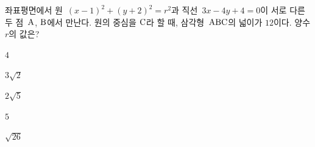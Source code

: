 좌표평면에서 원~$(x-1)^2+(y+2)^2=r^2$과 직선~$3x-4y+4=0$이 서로 다른 두 점~$\mathrm{A}$, $\mathrm{B}$에서 만난다. 원의 중심을 $\mathrm{C}$라 할 때, 삼각형~$\mathrm{ABC}$의 넓이가 $12$이다. 양수 $r$의 값은?
\begin{choices32}{\rule[-3ex]{0pt}{8ex}$4$}{\rule[-3ex]{0pt}{8ex}$3\sqrt2$}{\rule[-3ex]{0pt}{8ex}$2\sqrt5$}{\rule[-3ex]{0pt}{8ex}$5$}{\rule[-3ex]{0pt}{8ex}$\sqrt{26}$}\end{choices32}
